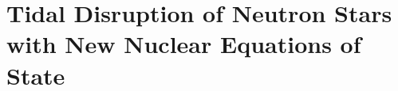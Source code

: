 \chapter{Tidal Disruption of Neutron Stars with New Nuclear Equations of State}
\label{chap:chapter-5}
